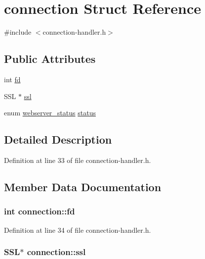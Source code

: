 \hypertarget{structconnection}{\section{connection Struct Reference}
\label{structconnection}
}


{\ttfamily \#include $<$connection-\/handler.\-h$>$}

\subsection*{Public Attributes}
\begin{DoxyCompactItemize}
\item 
int \hyperlink{structconnection_aa9a96cc6c66ef5a617f51247b2809a40}{fd}
\item 
S\-S\-L $\ast$ \hyperlink{structconnection_abaf979296936dbc887ace4543cb4fec5}{ssl}
\item 
enum \hyperlink{webserver_8h_a4b078d99ed3d03303ca3ba56f4a18d09}{webserver\-\_\-status} \hyperlink{structconnection_a70afd7d3c892d86014a13a5af6ce65e1}{status}
\end{DoxyCompactItemize}


\subsection{Detailed Description}


Definition at line 33 of file connection-\/handler.\-h.



\subsection{Member Data Documentation}
\hypertarget{structconnection_aa9a96cc6c66ef5a617f51247b2809a40}{
\subsubsection[{fd}]{\setlength{\rightskip}{0pt plus 5cm}int connection\-::fd}}\label{structconnection_aa9a96cc6c66ef5a617f51247b2809a40}


Definition at line 34 of file connection-\/handler.\-h.

\hypertarget{structconnection_abaf979296936dbc887ace4543cb4fec5}{
\subsubsection[{ssl}]{\setlength{\rightskip}{0pt plus 5cm}S\-S\-L$\ast$ connection\-::ssl}}\label{structconnection_abaf979296936dbc887ace4543cb4fec5}


